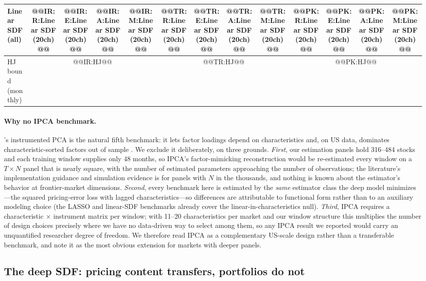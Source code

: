 \documentclass[12pt]{article}
\begin{document}
\begin{table}[htbp]
\begin{tabular}{l cccc cccc cccc}
Linear SDF (all) & @@IR:R:Linear SDF (20ch)@@ & @@IR:E:Linear SDF (20ch)@@ & @@IR:A:Linear SDF (20ch)@@ & @@IR:M:Linear SDF (20ch)@@ & @@TR:R:Linear SDF (20ch)@@ & @@TR:E:Linear SDF (20ch)@@ & @@TR:A:Linear SDF (20ch)@@ & @@TR:M:Linear SDF (20ch)@@ & @@PK:R:Linear SDF (20ch)@@ & @@PK:E:Linear SDF (20ch)@@ & @@PK:A:Linear SDF (20ch)@@ & @@PK:M:Linear SDF (20ch)@@ \\
\midrule
HJ bound (monthly) & \multicolumn{4}{c}{@@IR:HJ@@} & \multicolumn{4}{c}{@@TR:HJ@@} & \multicolumn{4}{c}{@@PK:HJ@@} \\
\bottomrule
\end{tabular}
\end{table}

\paragraph{Why no IPCA benchmark.} \citet{kps2019}'s instrumented PCA is the natural fifth benchmark: it lets factor loadings depend on characteristics and, on US data, dominates characteristic-sorted factors out of sample \citep{kps2019}. We exclude it deliberately, on three grounds. \emph{First}, our estimation panels hold 316--484 stocks and each training window supplies only 48 months, so IPCA's factor-mimicking reconstruction would be re-estimated every window on a $T\times N$ panel that is nearly square, with the number of estimated parameters approaching the number of observations; the literature's implementation guidance and simulation evidence is for panels with $N$ in the thousands, and nothing is known about the estimator's behavior at frontier-market dimensions. \emph{Second}, every benchmark here is estimated by the \emph{same} estimator class the deep model minimizes---the squared pricing-error loss with lagged characteristics---so differences are attributable to functional form rather than to an auxiliary modeling choice (the LASSO and linear-SDF benchmarks already cover the linear-in-characteristics null). \emph{Third}, IPCA requires a characteristic $\times$ instrument matrix per window; with 11--20 characteristics per market and our window structure this multiplies the number of design choices precisely where we have no data-driven way to select among them, so any IPCA result we reported would carry an unquantified researcher degree of freedom. We therefore read IPCA as a complementary US-scale design rather than a transferable benchmark, and note it as the most obvious extension for markets with deeper panels.

\subsection{The deep SDF: pricing content transfers, portfolios do not}\label{sec:deep}
\end{document}
